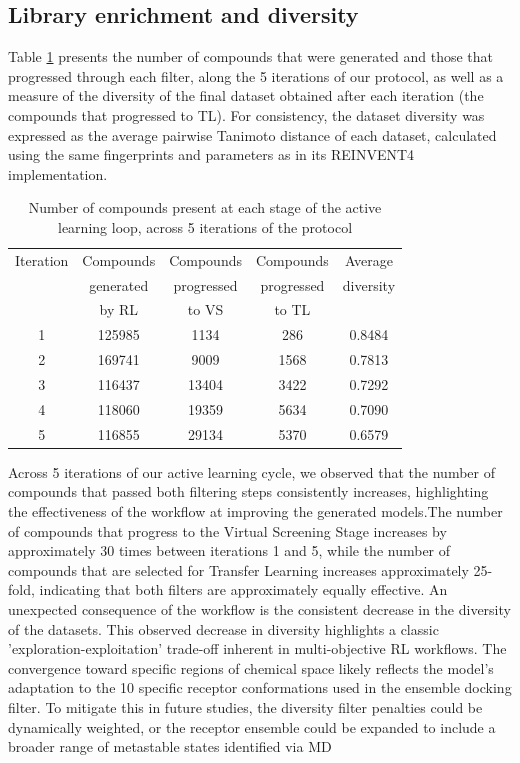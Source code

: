 \subsection{Library enrichment and diversity}
Table \ref{tab:library_enrichment} presents the number of compounds that were generated and those that progressed through each filter, along the 5 iterations of our protocol, as well as a measure of the diversity of the final dataset obtained after each iteration (the compounds that progressed to TL). For consistency, the dataset diversity was expressed as the average pairwise Tanimoto distance of each dataset, calculated using the same fingerprints and parameters as in its REINVENT4 implementation.  
\begin{table}[H]
  \caption{Number of compounds present at each stage of the active learning loop, across 5 iterations of the protocol}
  \label{tab:library_enrichment}
  \centering
  \begin{tabular}{ccccc}
    \hline
    Iteration & Compounds & Compounds & Compounds   & Average\\
              & generated & progressed & progressed & diversity\\
              & by RL     & to VS      & to TL\\
    \hline
    1 & 125985 & 1134  & 286  & 0.8484\\
    2 & 169741 & 9009  & 1568 & 0.7813\\
    3 & 116437 & 13404 & 3422 & 0.7292\\
    4 & 118060 & 19359 & 5634 & 0.7090\\
    5 & 116855 & 29134 & 5370 & 0.6579\\
    \hline
  \end{tabular}
\end{table}
Across 5 iterations of our active learning cycle, we observed that the number of compounds that passed both filtering steps consistently increases, highlighting the effectiveness of the workflow at improving the generated models.The number of compounds that progress to the Virtual Screening Stage increases by approximately 30 times between iterations 1 and 5, while the number of compounds that are selected for Transfer Learning increases approximately 25-fold, indicating that both filters are approximately equally effective.
An unexpected consequence of the workflow is the consistent decrease in the diversity of the datasets. This observed decrease in diversity highlights a classic 'exploration-exploitation' trade-off inherent in multi-objective RL workflows. The convergence toward specific regions of chemical space likely reflects the model’s adaptation to the 10 specific receptor conformations used in the ensemble docking filter. To mitigate this in future studies, the diversity filter penalties could be dynamically weighted, or the receptor ensemble could be expanded to include a broader range of metastable states identified via MD 

